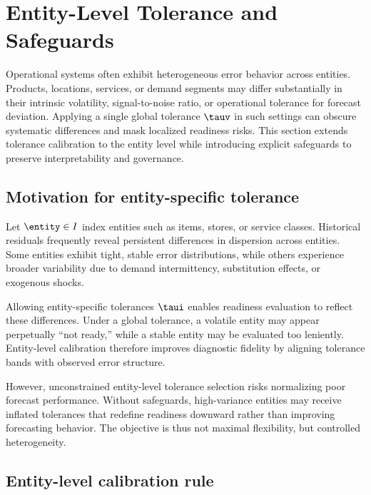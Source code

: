 \section{Entity-Level Tolerance and Safeguards}
\label{sec:entity_level}

Operational systems often exhibit heterogeneous error behavior across entities.
Products, locations, services, or demand segments may differ substantially in
their intrinsic volatility, signal-to-noise ratio, or operational tolerance for
forecast deviation.
Applying a single global tolerance $\tauv$ in such settings can obscure
systematic differences and mask localized readiness risks.
This section extends tolerance calibration to the entity level while introducing
explicit safeguards to preserve interpretability and governance.

\subsection{Motivation for entity-specific tolerance}
\label{subsec:entity_motivation}

Let $\entity \in I$ index entities such as items, stores, or service classes.
Historical residuals frequently reveal persistent differences in dispersion
across entities.
Some entities exhibit tight, stable error distributions, while others experience
broader variability due to demand intermittency, substitution effects, or
exogenous shocks.

Allowing entity-specific tolerances $\taui$ enables readiness evaluation to
reflect these differences.
Under a global tolerance, a volatile entity may appear perpetually ``not ready,''
while a stable entity may be evaluated too leniently.
Entity-level calibration therefore improves diagnostic fidelity by aligning
tolerance bands with observed error structure.

However, unconstrained entity-level tolerance selection risks normalizing poor
forecast performance.
Without safeguards, high-variance entities may receive inflated tolerances that
redefine readiness downward rather than improving forecasting behavior.
The objective is thus not maximal flexibility, but controlled heterogeneity.

\subsection{Entity-level calibration rule}
\label{subsec:entity_rule}

